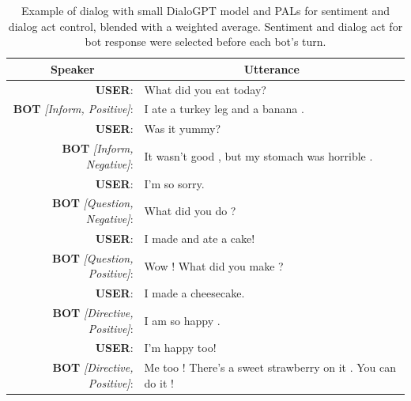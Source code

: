 \documentclass[11pt]{article}
\begin{document}
\begin{table}[]
\begin{tabular}{rl}
\multicolumn{1}{c}{Speaker}    & \multicolumn{1}{c}{Utterance}                               \\ \hline
\textbf{USER}:                          & What did you eat today?                                     \\
\textbf{BOT} \textit{{[}Inform, Positive{]}}:    & I ate a turkey leg and a banana .                           \\
\textbf{USER}:                          & Was it yummy?                                               \\
\textbf{BOT} \textit{{[}Inform, Negative{]}}:    & It wasn't good , but my stomach was horrible .              \\
\textbf{USER}:                          & I'm so sorry.                                               \\
\textbf{BOT} \textit{{[}Question, Negative{]}}:  & What did you do ?                                           \\
\textbf{USER}:                          & I made and ate a cake!                                      \\
\textbf{BOT} \textit{{[}Question, Positive{]}}:  & Wow ! What did you make ?                                   \\
\textbf{USER}:                          & I made a cheesecake.                                        \\
\textbf{BOT} \textit{{[}Directive, Positive{]}}: & I am so happy .                                             \\
\textbf{USER}:                          & I'm happy too!                                              \\
\textbf{BOT} \textit{{[}Directive, Positive{]}}: & Me too ! There's a sweet strawberry on it . You can do it !
\end{tabular}
\caption{Example of dialog with small DialoGPT model and PALs for sentiment and dialog act control, blended with a weighted average. Sentiment and dialog act for bot response were selected before each bot's turn.}
\label{tab:cake_example_dialog}
\end{table}
    
\end{document}

